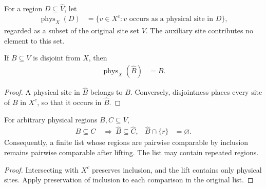 \begin{definition}
\label{def:extract_compressed_physical_region}
\leanok
For a region $D\subseteq\widehat V$, let
\begin{align}
 \operatorname{phys}_X(D)&=\{v\in X^c: v\text{ occurs as a physical site in }D\},
\end{align}
regarded as a subset of the original site set $V$. The auxiliary site
contributes no element to this set.
\end{definition}

\begin{theorem}
\label{thm:extract_lifted_physical_region}
\leanok
{}
If $B\subseteq V$ is disjoint from $X$, then
\begin{align}
 \operatorname{phys}_X(\widehat B)&=B.
\end{align}
\end{theorem}
\begin{proof}
\leanok
A physical site in $\widehat B$ belongs to $B$. Conversely, disjointness
places every site of $B$ in $X^c$, so that it occurs in $\widehat B$.
\end{proof}

\begin{theorem}
\label{thm:lifted_physical_regions_nested}
\leanok
{}
For arbitrary physical regions $B,C\subseteq V$,
\begin{align}
 B\subseteq C&\ \Longrightarrow\ \widehat B\subseteq\widehat C,
 &\widehat B\cap\{r\}&=\varnothing.
\end{align}
Consequently, a finite list whose regions are pairwise comparable by
inclusion remains pairwise comparable after lifting. The list may contain
repeated regions.
\end{theorem}
\begin{proof}
\leanok
Intersecting with $X^c$ preserves inclusion, and the lift contains only
physical sites. Apply preservation of inclusion to each comparison in the
original list.
\end{proof}

